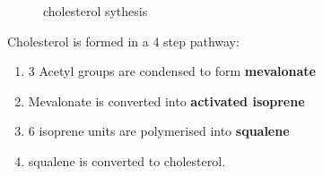 \documentclass[../main.tex]{subfiles}
\begin{document}
\begin{figure}[H]
	\centering
	\caption{cholesterol sythesis}
\end{figure}



Cholesterol is formed in a 4 step pathway: 
\begin{enumerate}
    \item  3 Acetyl groups are condensed to form 
\textbf{mevalonate}
\item Mevalonate is converted into \textbf{activated 
isoprene }
\item 6 \gls{isoprene} units are polymerised into 
\textbf{squalene}
\item \gls{squalene} is converted to cholesterol.
\end{enumerate}
\end{document}
